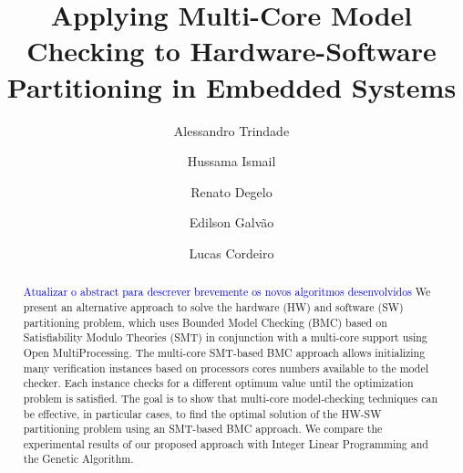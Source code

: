 %
%
%
%
%


\title{Applying Multi-Core Model Checking to Hardware-Software Partitioning in Embedded Systems}
\author{Alessandro Trindade\and Hussama Ismail\and Renato Degelo\and Edilson Galv\~ao\and Lucas Cordeiro}


\maketitle

\begin{abstract}
\textcolor{blue}{Atualizar o abstract para descrever brevemente os novos algoritmos desenvolvidos}
We present an alternative approach to solve the hardware (HW) and software (SW) partitioning problem, which uses Bounded Model Checking (BMC) based on Satisfiability Modulo Theories (SMT) in conjunction with a multi-core support using Open MultiProcessing. The multi-core SMT-based BMC approach allows initializing many verification instances based on processors cores numbers available to the model checker. Each instance checks for a different optimum value until the optimization problem is satisfied. The goal is to show that multi-core model-checking techniques can be effective, in particular cases, to find the optimal solution of the HW-SW partitioning problem using an SMT-based BMC approach. We compare the experimental results of our proposed approach with Integer Linear Programming and the Genetic Algorithm.
\end{abstract}

